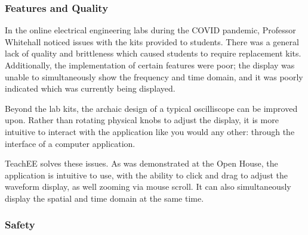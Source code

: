 \documentclass[letterpaper,11pt]{article}
\begin{document}


\subsubsection{Features and Quality}



In the online electrical engineering labs during the COVID pandemic, Professor
Whitehall noticed issues with the kits provided to students. There was a general
lack of quality and brittleness which caused students to require replacement
kits. Additionally, the implementation of certain features were poor; the
display was unable to simultaneously show the frequency and time domain, and it
was poorly indicated which was currently being displayed. 

Beyond the lab kits, the archaic design of a typical oscilliscope can be
improved upon. Rather than rotating physical knobs to adjust the display, it is
more intuitive to interact with the application like you would any other:
through the interface of a computer application.

TeachEE solves these issues. As was demonstrated at the Open House, the
application is intuitive to use, with the ability to click and drag to adjust
the waveform display, as well zooming via mouse scroll. It can also
simultaneously display the spatial and time domain at the same time.

\subsubsection{Safety}
\end{document}
